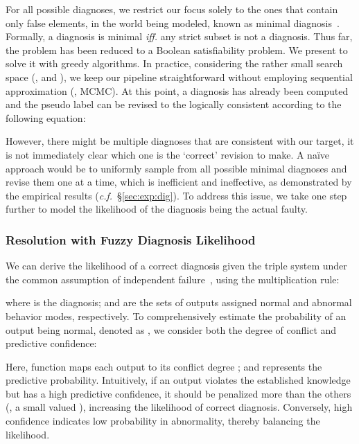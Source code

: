 \documentclass[10pt,twocolumn,letterpaper]{article}
\begin{document}
For all possible diagnoses, we restrict our focus solely to the ones that contain only false elements, in the world being modeled, known as minimal diagnosis~\cite{reiter1987theory}. Formally, a diagnosis  is minimal \textit{iff.} any strict subset  is not a diagnosis.
Thus far, the problem has been reduced to a Boolean satisfiability problem. We present to solve it with greedy algorithms.
In practice, considering the rather small search space (\ie,  and ), we keep our pipeline straightforward without employing sequential approximation (\eg, MCMC).
At this point, a diagnosis has already been computed and the pseudo label  can be revised to the logically consistent  according to the following equation:
\vspace{-3pt}


However, there might be multiple diagnoses that are consistent with our target,
it is not immediately clear which one is the `correct' revision to make.
A na\"ive approach would be to uniformly sample from all possible minimal diagnoses and revise them one at a time, which is inefficient and ineffective, as demonstrated by the empirical results (\textit{c.f.\!}~\S\ref{sec:exp:dig}).
To address this issue, we take one step further to model the likelihood of the diagnosis being the actual faulty.


\subsubsection{Resolution with Fuzzy Diagnosis Likelihood}\label{sec:meth:measure}

We can derive the likelihood of a correct diagnosis given the triple system  under the common assumption of independent failure~\cite{rodler2022random}, using the multiplication rule:
\vspace{-3pt}

where  is the diagnosis;  and  are the sets of outputs assigned normal and abnormal behavior modes, respectively.
To comprehensively estimate the probability of an output  being normal, denoted as , we consider both the degree of conflict and predictive confidence:
\vspace{-3pt}

Here, function  maps each output  to its conflict degree ; and  represents the predictive probability.
Intuitively, if an output violates the established knowledge but has a high predictive confidence, it should be penalized more than the others (\ie, a small valued ), increasing the likelihood of correct diagnosis.
Conversely, high confidence indicates low probability in abnormality, thereby balancing the likelihood.
\end{document}
